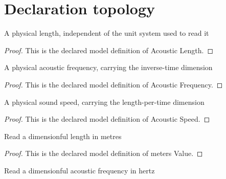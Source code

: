\section{Declaration topology}
\begin{definition}
  \label{def:physics:phyx-mini-0186:phyxminiproblems-problemphyxmini0186-acousticlength}
  A physical length, independent of the unit system used to read it
\end{definition}
\begin{proof}
  This is the declared model definition of Acoustic Length.
\end{proof}
\begin{definition}
  \label{def:physics:phyx-mini-0186:phyxminiproblems-problemphyxmini0186-acousticfrequency}
  A physical acoustic frequency, carrying the inverse-time dimension
\end{definition}
\begin{proof}
  This is the declared model definition of Acoustic Frequency.
\end{proof}
\begin{definition}
  \label{def:physics:phyx-mini-0186:phyxminiproblems-problemphyxmini0186-acousticspeed}
  A physical sound speed, carrying the length-per-time dimension
\end{definition}
\begin{proof}
  This is the declared model definition of Acoustic Speed.
\end{proof}
\begin{definition}
  \label{def:physics:phyx-mini-0186:phyxminiproblems-problemphyxmini0186-metersvalue}
  Read a dimensionful length in metres
\end{definition}
\begin{proof}
  This is the declared model definition of meters Value.
\end{proof}
\begin{definition}
  \label{def:physics:phyx-mini-0186:phyxminiproblems-problemphyxmini0186-hertzvalue}
  Read a dimensionful acoustic frequency in hertz
\end{definition}
